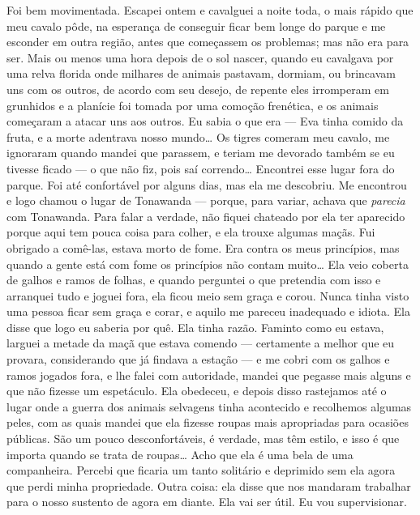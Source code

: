    Foi bem  movimentada. Escapei ontem e cavalguei a noite
toda, o mais rápido que meu cavalo pôde, na esperança de conseguir ficar
bem longe do parque e me esconder em outra região, antes que começassem os
problemas; mas não era para ser. Mais ou menos uma hora depois de o sol nascer,
quando eu cavalgava por uma relva florida onde milhares de animais pastavam, dormiam, 
ou brincavam uns com os outros, de acordo com seu desejo,
de repente eles irromperam em grunhidos e a planície foi tomada por uma comoção
frenética, e os animais começaram a atacar uns aos outros. Eu sabia o que era ---
Eva tinha comido da fruta, e a morte adentrava nosso mundo\ldots{} Os tigres
comeram meu cavalo, me ignoraram quando mandei que parassem, e teriam me
devorado também se eu tivesse ficado --- o que não fiz, pois saí correndo\ldots{}
Encontrei esse lugar fora do parque. Foi até confortável por alguns dias, mas
ela me descobriu. Me encontrou e logo chamou o lugar de Tonawanda --- porque,
para variar, achava que \textit{parecia} com Tonawanda. Para falar a verdade, não fiquei
chateado por ela ter aparecido porque aqui tem pouca coisa para colher, e ela
trouxe algumas maçãs. Fui obrigado a comê-las, estava morto de fome. Era
contra os meus princípios, mas quando a gente está com fome os princípios não
contam muito\ldots{} Ela veio coberta de galhos e ramos de folhas, e quando
perguntei o que pretendia com isso e arranquei tudo e joguei fora, ela
ficou meio sem graça e corou. Nunca tinha visto uma pessoa ficar sem
graça e corar, e aquilo me pareceu inadequado e idiota. Ela disse que logo eu
saberia por quê. Ela tinha razão. Faminto como eu estava, larguei a metade da
maçã que estava comendo --- certamente a melhor que eu provara,
considerando que já findava a estação --- e me cobri com os galhos e ramos 
jogados fora, e lhe falei com autoridade, mandei que pegasse mais
alguns e que não fizesse um espetáculo. Ela obedeceu, e depois
disso rastejamos até o lugar onde a guerra dos animais selvagens tinha
acontecido e recolhemos algumas peles, com as quais mandei que ela fizesse roupas
mais apropriadas para ocasiões públicas. São um pouco desconfortáveis, é
verdade, mas têm estilo, e isso é que importa quando se trata de roupas\ldots{} Acho
que ela é uma bela de uma companheira. Percebi que ficaria um tanto
solitário e deprimido sem ela agora que perdi minha propriedade. Outra coisa:
ela disse que nos mandaram trabalhar para o nosso sustento de agora em diante.
Ela vai ser útil. Eu vou supervisionar.


